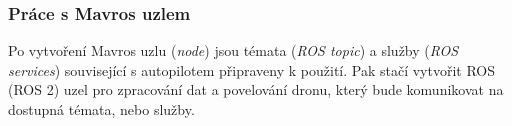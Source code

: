 \subsubsection{Práce s Mavros uzlem}

Po vytvoření Mavros uzlu (\textit{node}) jsou témata (\textit{ROS topic}) a služby (\textit{ROS services}) související s autopilotem připraveny k použití. Pak stačí vytvořit ROS (ROS 2) uzel pro zpracování dat a povelování dronu, který bude komunikovat na dostupná témata, nebo služby. \cite{MAVROS2}

